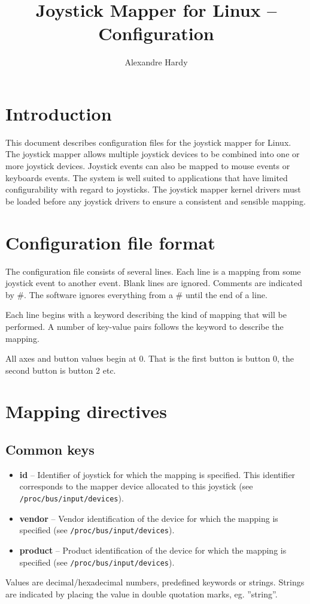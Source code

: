 \documentclass{article}
\title{Joystick Mapper for Linux -- Configuration}
\author{Alexandre Hardy}
\begin{document}
\maketitle
\section*{Introduction}
This document describes configuration files for
the joystick mapper for Linux. The joystick mapper
allows multiple joystick devices to be combined
into one or more joystick devices. Joystick 
events can also be mapped to mouse events
or keyboards events. The system is well suited
to applications that have limited configurability with
regard to joysticks. The joystick mapper kernel drivers
must be loaded before any joystick drivers to ensure
a consistent and sensible mapping.
\section*{Configuration file format}
The configuration file consists of several lines.
Each line is a mapping from some joystick event
to another event. Blank lines are ignored.
Comments are indicated by \#. The software
ignores everything from a \# until the end of a line.

Each line begins with a keyword describing the 
kind of mapping that will be performed. A number
of key-value pairs follows the keyword to describe
the mapping.

All axes and button values begin at 0. That is the first button
is button 0, the second button is button 2 etc.
\section{Mapping directives}
\subsection{Common keys}
\begin{itemize}
	\item {\bf id} -- Identifier of joystick for which the mapping is specified. This
			identifier corresponds to the mapper device allocated to this
			joystick (see {\tt /proc/bus/input/devices}).
	\item {\bf vendor} -- Vendor identification of the device for which the mapping
			is specified (see {\tt /proc/bus/input/devices}).
	\item {\bf product} -- Product identification of the device for which the mapping
			is specified (see {\tt /proc/bus/input/devices}).
\end{itemize}
Values are decimal/hexadecimal numbers, predefined keywords or strings.
Strings are indicated by placing the value in double quotation marks, eg. ''string''.
\end{document}
